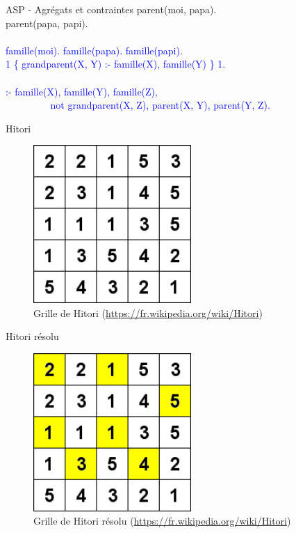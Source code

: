 \documentclass{beamer}
\begin{document}
\begin{frame}{ASP - Agrégats et contraintes}
	parent(moi, papa).\\
	parent(papa, papi).\\
	\textcolor{white}{cheatcode}\\
	\pause
	\textcolor{blue}{famille(moi). famille(papa). famille(papi).}\\
	\pause	
	\textcolor{blue}{1 \{ grandparent(X, Y) :- famille(X), famille(Y) \} 1.}\\
	\pause
	\textcolor{white}{cheatcode}\\
	\textcolor{blue}{:- famille(X), famille(Y), famille(Z),\\
	\pause
	\textcolor{white}{cheatcode} not grandparent(X, Z), parent(X, Y), parent(Y, Z).}
\end{frame}

\begin{frame}{Hitori}
	\begin{figure}[!h]
		\includegraphics[width=6cm]{hitori.png}
		\caption{Grille de Hitori (\href{https://fr.wikipedia.org/wiki/Hitori}{https://fr.wikipedia.org/wiki/Hitori})}
		\label{label-figure1}
	\end{figure}
\end{frame}

\begin{frame}{Hitori résolu}
	\begin{figure}[!h]
		\includegraphics[width=6cm]{Hitori_2.png}
		\caption{Grille de Hitori résolu (\href{https://fr.wikipedia.org/wiki/Hitori}{https://fr.wikipedia.org/wiki/Hitori})}
		\label{label-figure2}
	\end{figure}
\end{frame}
\end{document}
